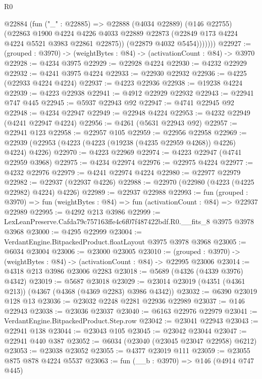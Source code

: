 \begin{lexlean}{R0}
\begin{coremodule}
            @22884
              (fun ("_" : @22885) =>
              @22888
                (@4034 @22889)
                (@146 @22755)
                (@22863
                  @1900
                  @4224
                  @4226
                  @4033
                  @22889
                  @22873
                  (@22849 @173 @4224 @4224 @5521 @3983 @22861 @22875))
                (@22879 @4032 @5454)))))))
@22927 := (grouped : @3970) -> (weightBytes : @84) -> (activationCount : @84) -> @3970
@22928 := @4234 @3975
@22929 := @22928 @4224
@22930 := @4232 @22929
@22932 := @4241 @3975 @4224
@22933 := @22930 @22932
@22936 := @4225 (@22933 @4224 @4224)
@22937 := @4223 @22936
@22938 := @19238 @4224
@22939 := @4223 @22938
@22941 := @4912 @22929 @22932
@22943 := @22941 @747 @445
@22945 := @5937 @22943 @92
@22947 := @4741 @22945 @92
@22948 := @4234 @22947
@22949 := @22948 @4224
@22953 := @4232 @22949 (@4241 @22947 @4224)
@22956 := @4261 (@5631 @22943 @92)
@22957 := @22941 @123
@22958 := @22957 @105
@22959 := @22956 @22958
@22969 := @22939 (@22953 (@4223 (@4223 (@19238 (@4235 @22959 @4268)) @4226) @4224) @4226)
@22970 := @4223 @22969
@22974 := @4223 @22947 (@4741 @22959 @3968)
@22975 := @4234 @22974
@22976 := @22975 @4224
@22977 := @4232 @22976
@22979 := @4241 @22974 @4224
@22980 := @22977 @22979
@22982 := @22937 (@22937 @4226)
@22988 := @22970 (@22980 (@4223 (@4225 @22982) @4224) @4226)
@22989 := @22937 @22988
@22993 := fun (grouped : @3970) =>
  fun (weightBytes : @84) => fun (activationCount : @84) => @22937 @22989
@22995 := @4292 @213 @3986
@22999 := LexLeanPreserve.Cafda79c757163ffe4c6f07f487422bdf.R0.__fits_8 @3975 @3978 @3968
@23000 := @4295 @22999
@23004 := VerdantEngine.BitpackedProduct.floatLayout @3975 @3978 @3968
@23005 := @6034 @23004
@23006 := @23000 @23005
@23010 := (grouped : @3970) -> (weightBytes : @84) -> (activationCount : @84) -> @22995 @23006
@23014 := @4318 @213 @3986 @23006 @2283
@23018 := @5689 (@4326 (@4339 @3976) @4342)
@23019 := @5687 @23018
@23029 := @23014 @23019 (@4351 (@4361 @213)) (@4367 (@4368 (@4369 @2283) @3986 @4342))
@23032 := @6390 @23019 @128 @13
@23036 := @23032 @2248 @2281 @22936 @22989
@23037 := @146 @22943
@23038 := @23036 @23037
@23040 := @6163 @22976 @22979
@23041 := VerdantEngine.BitpackedProduct.Step.row
@23042 := @23041 @22943
@23043 := @22941 @138
@23044 := @23043 @105
@23045 := @23042 @23044
@23047 := @22941 @440 @387
@23052 := @6034 (@23040 (@23045 @23047 @22958) @6212)
@23053 := @23038 @23052
@23055 := @4377 @23019 @111
@23059 := @23055 @875 @878 @4224 @5537
@23063 := fun (__b : @3970) => @146 (@4914 @747 @445)

\end{coremodule}
\end{lexlean}
